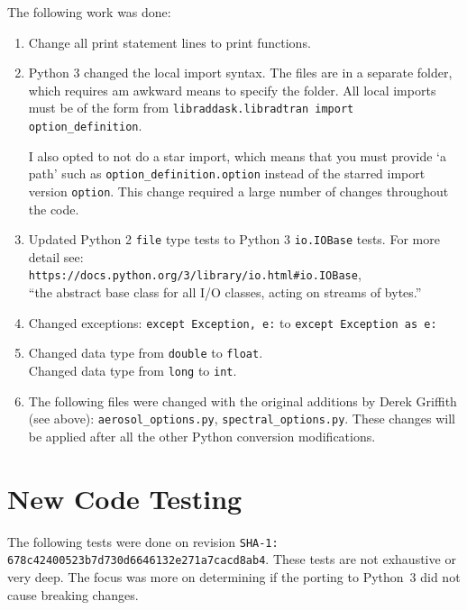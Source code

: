 The following work was done:
\begin{enumerate}
\item Change all print statement lines to print functions.

\item Python 3 changed the local import syntax. The \libradtran{} files are in a separate folder, which requires am awkward means to specify the folder.
     All local imports must be of the form from \lstinline{libraddask.libradtran import option_definition}. 
     
     I also opted to not do a star import, which means that you must provide `a path' such as 
     \lstinline{option_definition.option} instead of the starred import version \lstinline{option}.  This change required a large number of changes throughout the code.

\item Updated Python 2 \lstinline{file} type tests to Python 3 \lstinline{io.IOBase} tests. For more detail see:\\
\lstinline{https://docs.python.org/3/library/io.html#io.IOBase},\\ ``the abstract base class for all I/O classes, acting on streams of bytes.''

\item
Changed exceptions:
\lstinline{except Exception, e:} to 
\lstinline{except Exception as e:}

\item 
Changed data type from \lstinline{double} to \lstinline{float}.\\
Changed data type from \lstinline{long} to \lstinline{int}.


\item 
The following files were changed with the original additions by Derek Griffith (see above):
\lstinline{aerosol_options.py}, \lstinline{spectral_options.py}.  These changes will be applied after all the other Python conversion modifications.


\end{enumerate}


\section{New Code Testing}

The following tests were done on revision 
\lstinline{SHA-1: 678c42400523b7d730d6646132e271a7cacd8ab4}.
These tests are not exhaustive or very deep. The focus was more on determining if the porting to Python~3 did not cause breaking changes.

